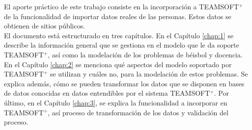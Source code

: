 El aporte práctico de este trabajo consiste en la incorporación a TEAMSOFT$^+$ de la funcionalidad de importar datos reales de las personas. Estos datos se obtienen de sitios públicos. \\

El documento está estructurado en tres capítulos. En el Capítulo \ref{chap:1} se describe la información general que se gestiona en el modelo que le da soporte TEAMSOFT$^+$, así como la modelación de los problemas de béisbol y docencia. En el Capítulo \ref{chap:2} se menciona qué aspectos del modelo soportado por TEAMSOFT$^+$ se utilizan y cuáles no, para la modelación de estos problemas. Se explica además, cómo se pueden transformar los datos que se disponen en bases de datos conocidas \citep{DISERTIC2020, INDER2020} en datos entendibles por el sistema TEAMSOFT$^+$. Por último, en el Capítulo \ref{chap:3}, se explica la funcionalidad a incorporar en TEAMSOFT$^+$, así proceso de transformación de los datos y validación del proceso.

